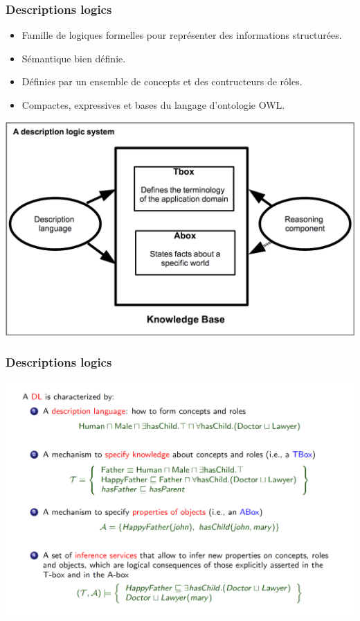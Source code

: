 \documentclass{beamer}
\begin{document}
\begin{frame}
\frametitle{Descriptions logics}
	\begin{itemize}
	\footnotesize
\item Famille de logiques formelles pour représenter des informations structurées.
	\item Sémantique bien définie.
	\item Définies par un ensemble de concepts et des contructeurs de rôles.
	\item Compactes, expressives et bases du langage d'ontologie OWL.
	\end{itemize}	
\centerline{\includegraphics[scale=0.34]{./Figures/DLKB.png}}
	

\end{frame}



\begin{frame}
\frametitle{Descriptions logics}
\centering
\includegraphics[scale=0.3]{Figures/DL.png}
\end{frame}
\end{document}
